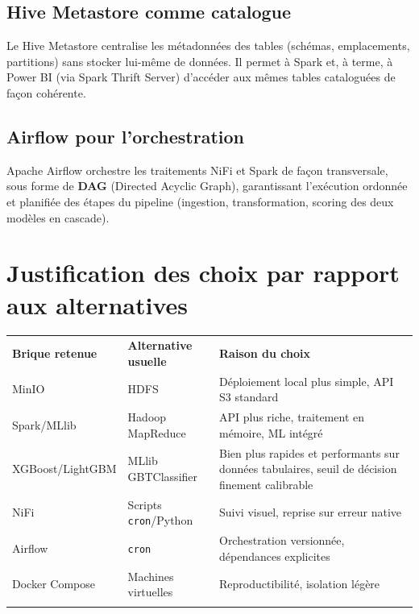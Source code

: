 \documentclass[11pt,a4paper]{report}
\let\oldtoprule\toprule
\renewcommand{\toprule}{\arrayrulecolor{corpslate}\oldtoprule\arrayrulecolor{black}}
\let\oldmidrule\midrule
\renewcommand{\midrule}{\arrayrulecolor{emsigreen}\oldmidrule\arrayrulecolor{black}}
\let\oldbottomrule\bottomrule
\renewcommand{\bottomrule}{\arrayrulecolor{corpslate}\oldbottomrule\arrayrulecolor{black}}
\begin{document}
\subsection{Hive Metastore comme catalogue}
Le Hive Metastore centralise les métadonnées des tables (schémas,
emplacements, partitions) sans stocker lui-même de données. Il permet à
Spark et, à terme, à Power BI (via Spark Thrift Server) d'accéder aux
mêmes tables cataloguées de façon cohérente.

\subsection{Airflow pour l'orchestration}
Apache Airflow orchestre les traitements NiFi et Spark de façon
transversale, sous forme de \textbf{DAG} (Directed Acyclic Graph),
garantissant l'exécution ordonnée et planifiée des étapes du pipeline
(ingestion, transformation, scoring des deux modèles en cascade).

\section{Justification des choix par rapport aux alternatives}

\begin{center}
\begin{tabular}{@{}lll@{}}
\toprule
\rowcolor{corpslate!10}
\textbf{Brique retenue} & \textbf{Alternative usuelle} & \textbf{Raison du choix} \\
\midrule
MinIO & HDFS & Déploiement local plus simple, API S3 standard \\
Spark/MLlib & Hadoop MapReduce & API plus riche, traitement en mémoire, ML intégré \\
XGBoost/LightGBM & MLlib GBTClassifier & Bien plus rapides et performants sur données tabulaires, seuil de décision finement calibrable \\
NiFi & Scripts \texttt{cron}/Python & Suivi visuel, reprise sur erreur native \\
Airflow & \texttt{cron} & Orchestration versionnée, dépendances explicites \\
Docker Compose & Machines virtuelles & Reproductibilité, isolation légère \\
\bottomrule
\end{tabular}
\end{center}
\end{document}
